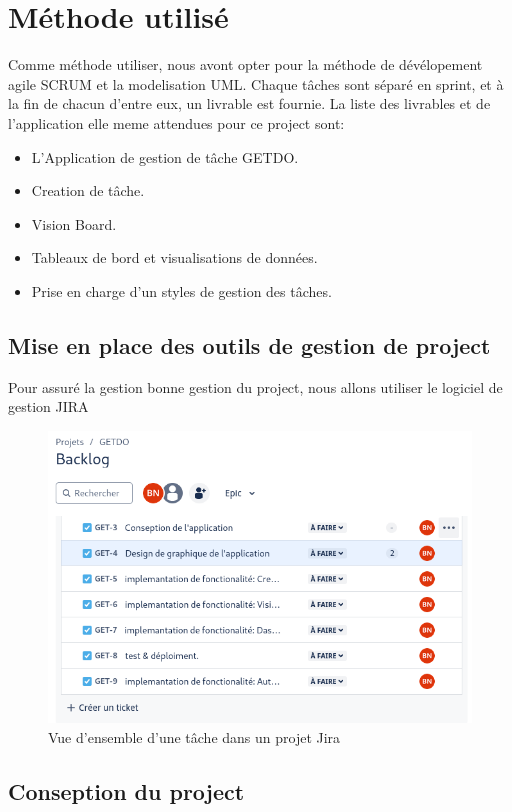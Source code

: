 \documentclass[a4paper,12pt]{report}
\begin{document}
\section{Méthode utilisé}
Comme méthode utiliser, nous avont opter pour la méthode de dévélopement agile SCRUM et la modelisation UML. Chaque tâches sont séparé en sprint, et à la fin de chacun d'entre eux, un livrable est fournie. La liste des livrables et de l'application elle meme attendues pour ce project sont:
\begin{itemize}
  \item L'Application de gestion de tâche GETDO.
  \item Creation de tâche.
  \item Vision Board.
  \item Tableaux de bord et visualisations de données.
  \item Prise en charge d'un styles de gestion des tâches.
\end{itemize}

\subsection{Mise en place des outils de gestion de project}
Pour assuré la gestion bonne gestion du project, nous allons utiliser le logiciel de gestion JIRA

\begin{figure}[h!]
    \includegraphics[width=1\textwidth]{./images/jira_project_task.png}
    \caption{Vue d'ensemble d'une tâche dans un projet Jira}
    \label{fig:jira_project_task}
\end{figure}
\subsection{Conseption du project}
\end{document}
